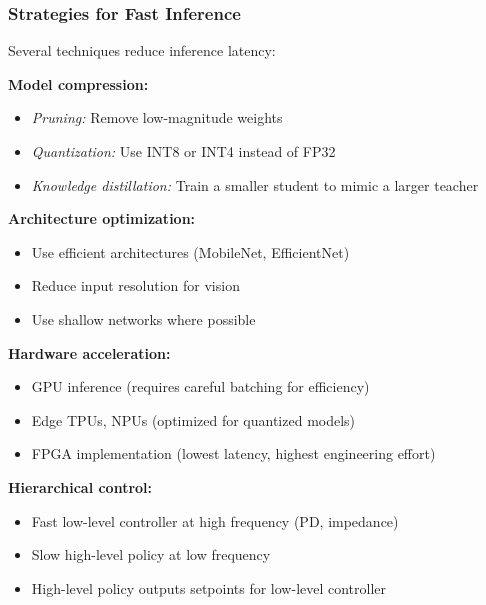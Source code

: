 \subsubsection{Strategies for Fast Inference}

Several techniques reduce inference latency:

\textbf{Model compression:}
\begin{itemize}
    \item \textit{Pruning:} Remove low-magnitude weights
    \item \textit{Quantization:} Use INT8 or INT4 instead of FP32
    \item \textit{Knowledge distillation:} Train a smaller student to mimic a larger teacher
\end{itemize}

\textbf{Architecture optimization:}
\begin{itemize}
    \item Use efficient architectures (MobileNet, EfficientNet)
    \item Reduce input resolution for vision
    \item Use shallow networks where possible
\end{itemize}

\textbf{Hardware acceleration:}
\begin{itemize}
    \item GPU inference (requires careful batching for efficiency)
    \item Edge TPUs, NPUs (optimized for quantized models)
    \item FPGA implementation (lowest latency, highest engineering effort)
\end{itemize}

\textbf{Hierarchical control:}
\begin{itemize}
    \item Fast low-level controller at high frequency (PD, impedance)
    \item Slow high-level policy at low frequency
    \item High-level policy outputs setpoints for low-level controller
\end{itemize}

